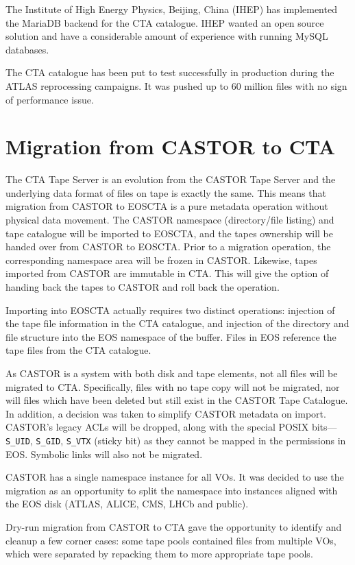 \documentclass{webofc}
\begin{document}
The Institute of High Energy Physics, Beijing, China (IHEP) has implemented the
MariaDB backend for the CTA catalogue.  IHEP wanted an open source solution and
have a considerable amount of experience with running MySQL databases.

The CTA catalogue has been put to test successfully in production during the ATLAS
reprocessing campaigns. It was pushed up to 60 million files with no sign
of performance issue.

\section{Migration from CASTOR to CTA}

The CTA Tape Server is an evolution from the CASTOR Tape Server and the underlying data format of files on tape is exactly the same.
This means that migration from CASTOR to EOSCTA is a pure metadata operation without physical data movement. The CASTOR namespace 
(directory/file listing) and tape catalogue will be imported to EOSCTA, and the tapes ownership will 
be handed over from CASTOR to EOSCTA. Prior to a migration operation, the corresponding namespace area will be frozen in CASTOR. Likewise, 
tapes imported from CASTOR are immutable in CTA. This will give the option of handing back the tapes to CASTOR and roll back the operation.

Importing into EOSCTA actually requires two distinct operations: injection of the tape file information in the CTA catalogue,
and injection of the directory and file structure into the EOS namespace of the buffer. Files in EOS reference the
tape files from the CTA catalogue.

As CASTOR is a system with both disk and tape elements, not all files will be migrated to CTA. Specifically, files with no
tape copy will not be migrated, nor will files which have been deleted but still exist in the CASTOR Tape Catalogue.
In addition, a decision was taken to simplify CASTOR metadata on import. CASTOR's legacy ACLs will be dropped, along with
the special POSIX bits---\texttt{S\_UID}, \texttt{S\_GID}, \texttt{S\_VTX} (sticky bit) as they cannot 
be mapped in the permissions in EOS. Symbolic links will also not be migrated.

CASTOR has a single namespace instance for all VOs. It was decided to use the migration as an opportunity to split the namespace
into instances aligned with the EOS disk (ATLAS, ALICE, CMS, LHCb and public).

Dry-run migration from CASTOR to CTA gave the opportunity to identify and cleanup a few corner cases: some 
tape pools contained files from multiple VOs, which were separated by repacking them to more appropriate tape pools.
\end{document}
